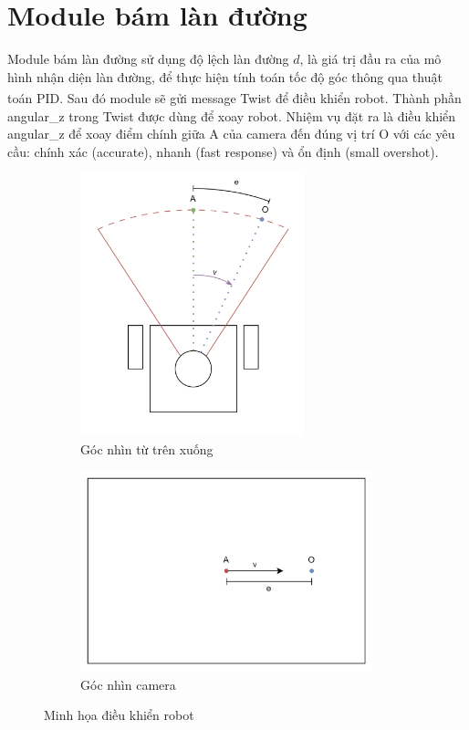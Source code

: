\section{Module bám làn đường}
Module bám làn đường sử dụng độ lệch làn đường $d$, là giá trị đầu ra của mô hình nhận diện làn đường, để thực hiện tính toán tốc độ góc thông qua thuật toán PID\textsuperscript{\cite{pid}}. Sau đó module sẽ gửi message Twist để điều khiển robot. Thành phần angular\_z trong Twist được dùng để xoay robot. Nhiệm vụ đặt ra là điều khiển angular\_z để xoay điểm chính giữa A của camera đến đúng vị trí O với các yêu cầu: chính xác (accurate), nhanh (fast response) và ổn định (small overshot).\\
\begin{figure}[!hbt]
    \begin{subfigure}{0.4\textwidth}
        \centering
        \includegraphics[width=6.5cm]{img/4_Implement/lane_keeping/top_down_view.png}
        \caption{Góc nhìn từ trên xuống}
    \end{subfigure}%
    \begin{subfigure}{0.6\textwidth}
        \centering
        \includegraphics[width=8.5cm]{img/4_Implement/lane_keeping/camera_view.png}
        \caption{Góc nhìn camera}
    \end{subfigure}
    \caption{Minh họa điều khiển robot}
\end{figure}\\

